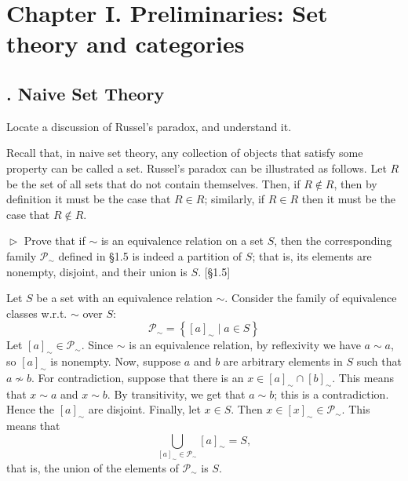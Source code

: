 \documentclass[12pt,letterpaper,boxed]{hmcpset}
\begin{document}
\newpage

\section{Chapter I.\hspace{0.2em} Preliminaries: Set theory and categories}

\subsection{. Naive Set Theory}

\begin{problem}[1.1]
	Locate a discussion of Russel's paradox, and understand it.
\end{problem}
\begin{solution}
	Recall that, in naive set theory, any collection of objects
	that satisfy some property can be called a set. Russel's paradox can be
	illustrated as follows.  Let $R$ be the set of all sets that do not contain
	themselves. Then, if $R\notin R$, then by definition it must be the case that
	$R\in R$; similarly, if $R\in R$ then it must be the case that $R\notin R$.
\end{solution}

\hypertarget{Exercise I.1.2}{}
\begin{problem}[1.2]
	$\vartriangleright$ Prove that if $\sim$ is an equivalence relation on a set $S$, then
	the corresponding family $\mathscr{P}_{\sim}$ defined in \S1.5 is indeed a
	partition of $S$; that is, its elements are nonempty, disjoint, and their union
	is $S$. [\S1.5]
\end{problem}

\begin{solution}
	Let $S$ be a set with an equivalence relation $\sim$.
	Consider the family of equivalence classes w.r.t. $\sim$ over $S$:
	\[ 
	\mathscr{P}_{\sim} = \left\{[a]_{\sim} \mid a\in S\right\} 
	\]
	Let $[a]_{\sim}\in\mathscr{P}_{\sim}$. Since $\sim$ is an equivalence relation,
	by reflexivity we have $a\sim a$, so $[a]_{\sim}$ is nonempty. Now, suppose
	$a$ and $b$ are arbitrary elements in $S$ such that $a\not\sim b$. For
	contradiction, suppose that there is an $x\in [a]_{\sim}\cap[b]_{\sim}$. This
	means that $x\sim a$ and $x\sim b$. By transitivity, we get that $a\sim b$; this
	is a contradiction. Hence the $[a]_{\sim}$ are disjoint. Finally, let $x\in S$.
	Then $x\in[x]_{\sim}\in \mathscr{P}_{\sim}$. This means that
	\[ \bigcup_{[a]_{\sim} \in \mathscr{P}_{\sim}} [a]_{\sim} = S, \]
	that is, the union of the elements of $\mathscr{P}_{\sim}$ is $S$.
\end{solution}
\end{document}
